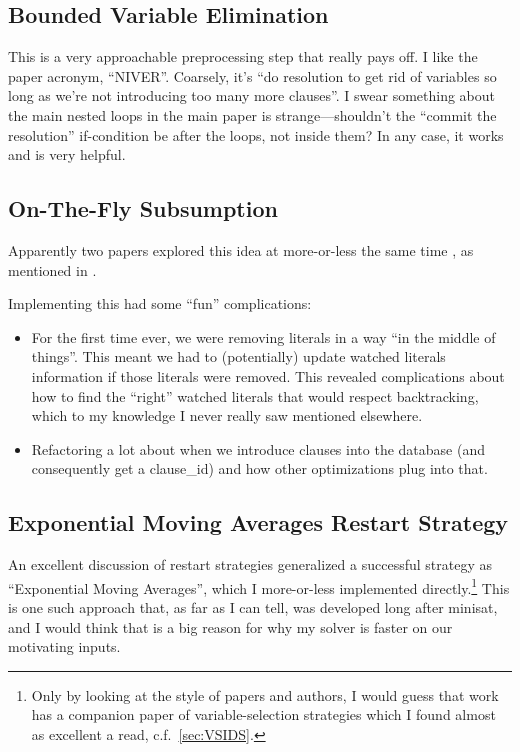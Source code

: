 \documentclass{article}
\begin{document}
\subsection{Bounded Variable Elimination}
This is a very approachable preprocessing step that really pays off\cite{subbarayanpradhan2004}.
I like the paper acronym, ``NIVER''. Coarsely, it's ``do resolution to get rid of variables so long as we're not introducing too many more clauses''.
I swear something about the main nested loops in the main paper is strange---shouldn't the ``commit the resolution'' if-condition be after the loops, not inside them?
In any case, it works and is very helpful.
\subsection{On-The-Fly Subsumption}
Apparently two papers explored this idea at more-or-less the same time
\cite{hamadijabboursais2010,hansomenzi2009}, as mentioned in \cite[236]{knuth2015}.

Implementing this had some ``fun'' complications:
\begin{itemize}
    \item For the first time ever, we were removing literals in a way ``in the middle of things''.
          This meant we had to (potentially) update watched literals information if those literals were removed.
          This revealed complications about how to find the ``right'' watched literals that would respect backtracking, which to my knowledge I never really saw mentioned elsewhere.
    \item Refactoring a lot about when we introduce clauses into the database (and consequently get a clause\_id) and how other optimizations plug into that.
\end{itemize}
\subsection{Exponential Moving Averages Restart Strategy}
An excellent discussion of restart strategies\cite{bierefrohlich2018} generalized a successful strategy as ``Exponential Moving Averages'',
which I more-or-less implemented directly.\footnote{Only by looking
    at the style of papers and authors, I would guess that work has a companion paper of variable-selection strategies\cite{bierefrohlich2015} which I found almost as excellent a read, c.f.\ \cref{sec:VSIDS}.}
This is one such approach that, as far as I can tell, was developed long after minisat, and I would think that is a big reason for why my solver is faster on our motivating inputs.
\end{document}
